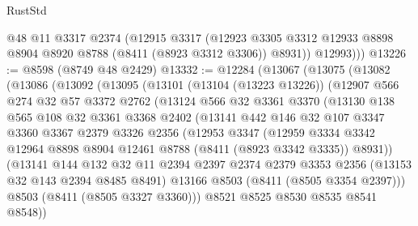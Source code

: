 \begin{lexlean}{RustStd}
\begin{coremodule}
          @48
          @11
          @3317
          @2374
          (@12915
            @3317
            (@12923 @3305 @3312 @12933 @8898 @8904 @8920 @8788 (@8411 (@8923 @3312 @3306)) @8931))
          @12993)))
@13226 := @8598 (@8749 @48 @2429)
@13332 := @12284
    (@13067
      (@13075
        (@13082
          (@13086
            (@13092
              (@13095
                (@13101
                  (@13104 (@13223 @13226))
                  (@12907
                    @566
                    @274
                    @32
                    @57
                    @3372
                    @2762
                    (@13124
                      @566
                      @32
                      @3361
                      @3370
                      (@13130
                        @138
                        @565
                        @108
                        @32
                        @3361
                        @3368
                        @2402
                        (@13141
                          @442
                          @146
                          @32
                          @107
                          @3347
                          @3360
                          @3367
                          @2379
                          @3326
                          @2356
                          (@12953
                            @3347
                            (@12959
                              @3334
                              @3342
                              @12964
                              @8898
                              @8904
                              @12461
                              @8788
                              (@8411 (@8923 @3342 @3335))
                              @8931))
                          (@13141
                            @144
                            @132
                            @32
                            @11
                            @2394
                            @2397
                            @2374
                            @2379
                            @3353
                            @2356
                            (@13153 @32 @143 @2394 @8485 @8491)
                            @13166
                            @8503
                            (@8411 (@8505 @3354 @2397)))
                          @8503
                          (@8411 (@8505 @3327 @3360)))
                        @8521
                        @8525
                        @8530
                        @8535
                        @8541
                        @8548))

\end{coremodule}
\end{lexlean}
